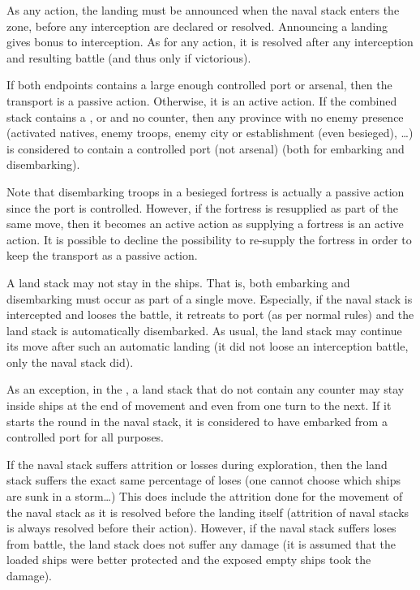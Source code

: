 As any action, the landing must be announced when the naval stack enters the
zone, before any interception are declared or resolved. Announcing a landing
gives bonus to interception. As for any action, it is resolved after any
interception and resulting battle (and thus only if victorious).

If both endpoints contains a large enough controlled port or arsenal, then the
transport is a passive action. Otherwise, it is an active action. If the
combined stack contains a \LeaderE, \LeaderC or \LeaderGov and no \ARMY
counter, then any \ROTW province with no enemy presence (activated natives,
enemy troops, enemy city or establishment (even besieged), \ldots) is
considered to contain a controlled port (not arsenal) (both for embarking and
disembarking).

Note that disembarking troops in a besieged fortress is actually a passive
action since the port is controlled. However, if the fortress is resupplied as
part of the same move, then it becomes an active action as supplying a
fortress is an active action. It is possible to decline the possibility to
re-supply the fortress in order to keep the transport as a passive action.

A land stack may not stay in the ships. That is, both embarking and
disembarking must occur as part of a single move. Especially, if the naval
stack is intercepted and looses the battle, it retreats to port (as per normal
rules) and the land stack is automatically disembarked. As usual, the land
stack may continue its move after such an automatic landing (it did not loose
an interception battle, only the naval stack did).

As an exception, in the \ROTW, a land stack that do not contain any \ARMY
counter may stay inside ships at the end of movement and even from one turn to
the next. If it starts the round in the naval stack, it is considered to have
embarked from a controlled port for all purposes.

If the naval stack suffers attrition or losses during exploration, then the
land stack suffers the exact same percentage of loses (one cannot choose which
ships are sunk in a storm\ldots) This does include the attrition done for the
movement of the naval stack as it is resolved before the landing itself
(attrition of naval stacks is always resolved before their action). However,
if the naval stack suffers loses from battle, the land stack does not suffer
any damage (it is assumed that the loaded ships were better protected and the
exposed empty ships took the damage).

